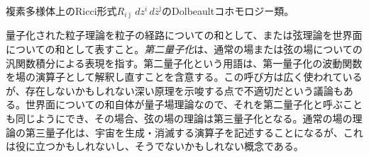 {複素多様体上のRicci形式$R_{i\bar\jmath}\,dz^i\,d\bar z^{\bar\jmath}$のDolbeaultコホモロジー類。}

{量子化された粒子理論を粒子の経路についての和として、または弦理論を世界面についての和として表すこと。\emph{第二量子化}は、通常の場または弦の場についての汎関数積分による表現を指す。第二量子化という用語は、第一量子化の波動関数を場の演算子として解釈し直すことを含意する。この呼び方は広く使われているが、存在しないかもしれない深い原理を示唆する点で不適切だという議論もある。世界面についての和自体が量子場理論なので、それを第二量子化と呼ぶことも同じようにでき、その場合、弦の場の理論は第三量子化となる。通常の場の理論の第三量子化は、宇宙を生成・消滅する演算子を記述することになるが、これは役に立つかもしれないし、そうでないかもしれない概念である。}
